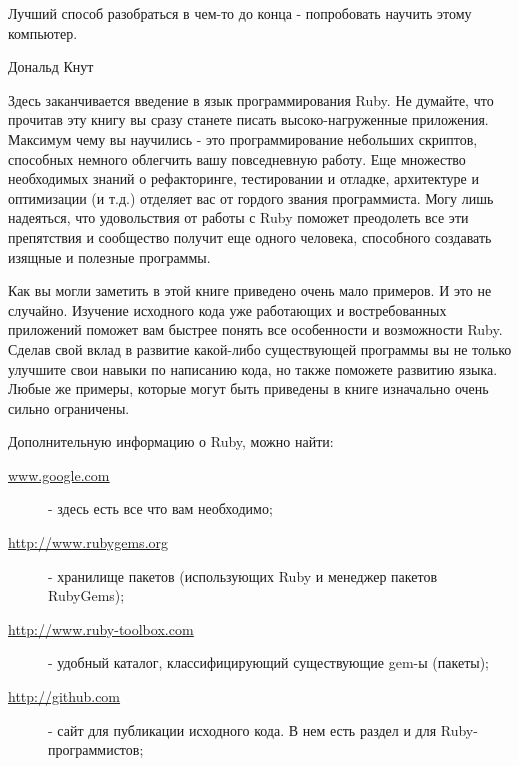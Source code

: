 \epigraph
{Лучший способ разобраться в чем-то до конца - попробовать научить этому компьютер.}
{Дональд Кнут}

Здесь заканчивается введение в язык программирования Ruby. Не думайте, что прочитав эту книгу вы сразу станете писать высоко-нагруженные приложения. Максимум чему вы научились - это программирование небольших скриптов, способных немного облегчить вашу повседневную работу. Еще множество необходимых знаний о рефакторинге, тестировании и отладке, архитектуре и оптимизации (и т.д.) отделяет вас от гордого звания программиста. Могу лишь надеяться, что удовольствия от работы с Ruby поможет преодолеть все эти препятствия и сообщество получит еще одного человека, способного создавать изящные и полезные программы. 

Как вы могли заметить в этой книге приведено очень мало примеров. И это не случайно. Изучение исходного кода уже работающих и востребованных приложений поможет вам быстрее понять все особенности и возможности Ruby. Сделав свой вклад в развитие какой-либо существующей программы вы не только улучшите свои навыки по написанию кода, но также поможете развитию языка. Любые же примеры, которые могут быть приведены в книге изначально очень сильно ограничены. 

Дополнительную информацию о Ruby, можно найти:
\begin{description}
  \item[\href{www.google.com}{\underline{www.google.com}}] - здесь есть все что вам необходимо; 
  \item[\href{http://www.rubygems.org}{\underline{http://www.rubygems.org}}] - хранилище пакетов (использующих Ruby и менеджер пакетов RubyGems);
  \item[\href{http://www.ruby-toolbox.com}{\underline{http://www.ruby-toolbox.com}}] - удобный каталог, классифицирующий существующие gem-ы (пакеты);
  \item[\href{http://github.com}{\underline{http://github.com}}] - сайт для публикации исходного кода. В нем есть раздел и для Ruby-программистов; 
\end{description} 